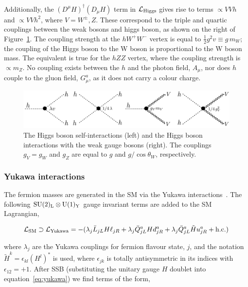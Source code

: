 Additionally, the $(D^\mu H)^{\dagger}(D_\mu H)$ term in $\mathcal{L}_{\rm{Higgs}}$ gives rise to terms $\propto VVh$ and $\propto VVh^2$, where $V=W^{\pm},Z$. These correspond to the triple and quartic couplings between the weak bosons and higgs boson, as shown on the right of Figure~\ref{fig:feynman_higgs_interactions}. The coupling strength at the $hW^+W^-$ vertex is equal to $\frac{1}{2}g^2v \equiv g\,m_W$; the coupling of the Higgs boson to the W boson is proportional to the W boson mass. The equivalent is true for the $hZZ$ vertex, where the coupling strength is $\propto m_Z$. No coupling exists between the $h$ and the photon field, $A_\mu$, nor does $h$ couple to the gluon field, $G^a_\mu$, as it does not carry a colour charge.

\begin{figure}[htb!]
  \centering
  \includegraphics[width=.9\linewidth]{Figures/theory/higgs_interaction.pdf}
  \caption[The Higgs boson interactions]
  {
    The Higgs boson self-interactions (left) and the Higgs boson interactions with the weak gauge bosons (right). The couplings $g_V=g_W$ and $g_Z$ are equal to $g$ and $g/\cos{\theta_W}$, respectively.
  }
  \label{fig:feynman_higgs_interactions}
\end{figure}

\subsubsection{Yukawa interactions}
The fermion masses are generated in the SM via the Yukawa interactions~\cite{Thomson:2013zua}. The following ${\rm{SU}(2)_{\rm{L}}}\otimes{\rm{U}}(1)_{\rm{Y}}$ gauge invariant terms are added to the SM Lagrangian,

\begin{equation}\label{eq:yukawa}
    \mathcal{L}_{\rm{SM}} \supset \mathcal{L}_{\rm{Yukawa}} = -(\lambda_j \bar{L}_{jL} H \ell_{jR} + \lambda_j \bar{Q}^a_{jL} H d^a_{jR} + \lambda_j \bar{Q}^a_{jL} \tilde{H} u^a_{jR} + {\rm{h.c.}})
\end{equation}

\noindent
where $\lambda_j$ are the Yukawa couplings for fermion flavour state, $j$, and the notation $\tilde{H}^k=\epsilon_{kl}(H^l)^*$ is used, where $\epsilon_{jk}$ is totally antisymmetric in its indices with $\epsilon_{12}=+1$. After SSB (substituting the unitary gauge $H$ doublet into equation~\ref{eq:yukawa}) we find terms of the form,


